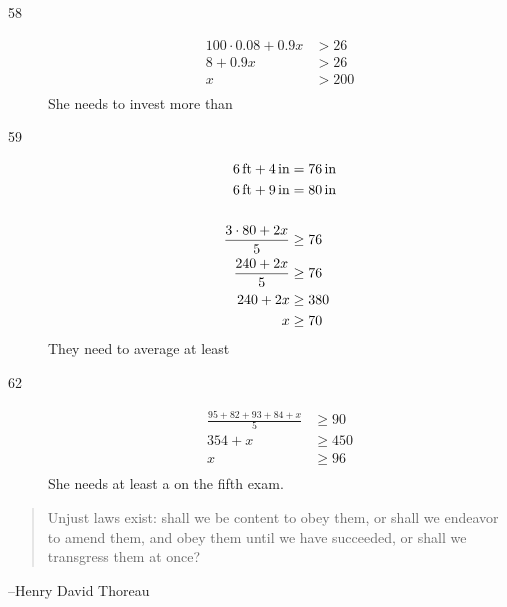 \documentclass[letterpaper]{exam}
\begin{document}
\begin{description}
      \item[58]
        \begin{align*}
          100 \cdot 0.08 + 0.9x & > 26 \\
          8 + 0.9x              & > 26 \\
          x                     & > 200 \\
        \end{align*}
        She needs to invest more than 

      \item[59]
        \begin{align*}
          \unit[6]{ft} + \unit[4]{in} &= \unit[76]{in} \\
          \unit[6]{ft} + \unit[9]{in} &= \unit[80]{in} \\
          \\
          \frac{3 \cdot 80 + 2x}{5} & \geq 76 \\
          \frac{240 + 2x}{5}        & \geq 76 \\
          240 + 2x                  & \geq 380 \\
          x                         & \geq 70 \\
        \end{align*}
        They need to average at least 

      \item[62]
        \begin{align*}
          \frac{95 + 82 + 93 + 84 + x}{5} & \geq 90 \\
          354 + x                         & \geq 450 \\
          x                               & \geq 96 \\
        \end{align*}
        She needs at least a  on the fifth exam.
        
    \end{description}

  \fi

  \ifprintanswers{}
  \else
    \vspace{4 cm}
    \begin{quote}
      \begin{em}
        Unjust laws exist: shall we be content to obey them, or shall we endeavor
        to amend them, and obey them until we have succeeded, or shall we
        transgress them at once?
      \end{em}
    \end{quote}
    \hspace{1 cm} --Henry David Thoreau
    
  \fi
\end{document}

